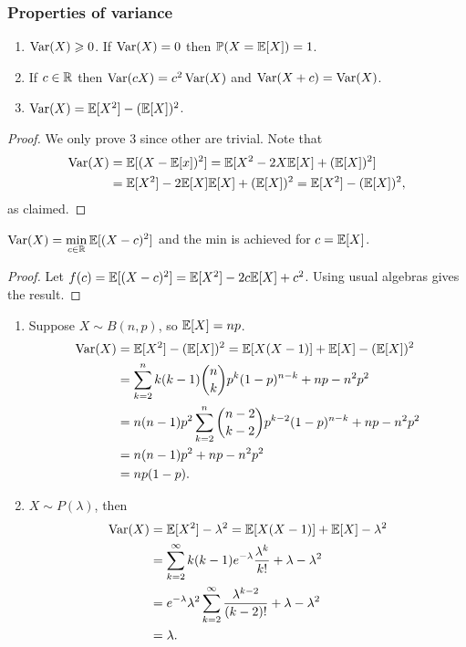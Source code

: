 \subsubsection*{Properties of variance}
\begin{proposition}
    \begin{enumerate}
        \item $ \operatorname{Var}(X)\geqslant 0 $. If $ \operatorname{Var}(X)=0 $ then $ \mathbb{P}(X={\mathbb{E}}[X])=1 $.
        \item If $c\in {\mathbb{R}}$ then $ \operatorname{Var}(cX)=c^2\operatorname{Var}(X) $ and $ \operatorname{Var}(X+c)=\operatorname{Var}(X) $.
        \item $ \operatorname{Var}(X)={\mathbb{E}}[X^2]-({\mathbb{E}}[X])^2 $.
    \end{enumerate}
\end{proposition}
\begin{proof}
    We only prove 3 since other are trivial. Note that 
    \begin{align*}
        \operatorname{Var}(X)&= {\mathbb{E}}[(X-{\mathbb{E}}[x])^2] = {\mathbb{E}}[X^2-2X{\mathbb{E}}[X]+({\mathbb{E}}[X])^2]\\ 
        &= {\mathbb{E}}[X^2]-2{\mathbb{E}}[X]{\mathbb{E}}[X]+({\mathbb{E}}[X])^2={\mathbb{E}}[X^2]-({\mathbb{E}}[X])^2,
    \end{align*}
    as claimed.
\end{proof}

\begin{proposition}
    $ \displaystyle \operatorname{Var}(X) = \min_{c\in {\mathbb{R}}}{\mathbb{E}}[(X-c)^2] $ and the min is achieved for $ c={\mathbb{E}}[X] $.
\end{proposition}
\begin{proof}
    Let $ f(c)={\mathbb{E}}[(X-c)^2] = {\mathbb{E}}[X^2]-2c{\mathbb{E}}[X]+c^2 $. Using usual algebras gives the result.
\end{proof}

\begin{example}
    \begin{enumerate}
        \item Suppose $ X\sim B(n,p) $, so $ {\mathbb{E}}[X]=np $.
        \begin{align*}
            \operatorname{Var}(X) &= {\mathbb{E}}[X^2]-({\mathbb{E}}[X])^2 = {\mathbb{E}}[X(X-1)]+{\mathbb{E}}[X]-({\mathbb{E}}[X])^2\\ 
            &= \sum_{k=2}^{n}k(k-1) \binom{n}{k}p^k (1-p)^{n-k} +np-n^2p^2\\ 
            &= n(n-1)p^2 \sum_{k=2}^{n}\binom{n-2}{k-2}p^{k-2}(1-p)^{n-k}+np-n^2p^2\\ 
            &= n(n-1)p^2+np-n^2p^2\\ 
            &= np(1-p).
        \end{align*}
        \item $ X\sim P(\lambda) $, then 
        \begin{align*}
            \operatorname{Var}(X) &= {\mathbb{E}}[X^2]-\lambda^2 = {\mathbb{E}}[X(X-1)]+{\mathbb{E}}[X]-\lambda^2\\ 
            &= \sum_{k=2}^{\infty} k(k-1)e^{-\lambda}\frac{\lambda^k}{k!}+\lambda-\lambda^2\\ 
            &= e^{-\lambda}\lambda^2\sum_{k=2}^{\infty}\frac{\lambda^{k-2}}{(k-2)!}+\lambda-\lambda^2\\ 
            &= \lambda.
        \end{align*}
    \end{enumerate}
\end{example}

